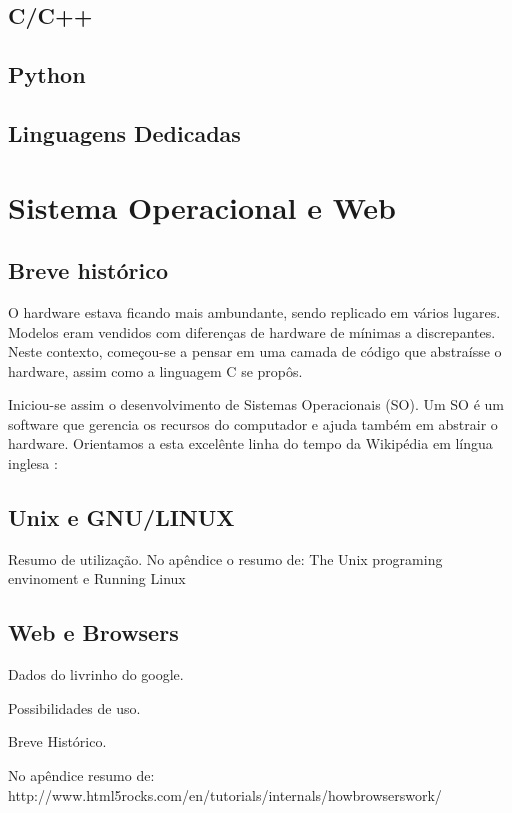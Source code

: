 \subsection{C/C++}

\subsection{Python}

\subsection{Linguagens Dedicadas}

\section{Sistema Operacional e Web}

\subsection{Breve histórico}

O hardware estava ficando mais ambundante, sendo replicado em 
vários lugares. Modelos eram vendidos com diferenças de hardware 
de mínimas a discrepantes. Neste contexto, começou-se a
pensar em uma camada de código que abstraísse o hardware, assim
como a linguagem C se propôs.

Iniciou-se assim o desenvolvimento de Sistemas Operacionais (SO).
Um SO é um software que gerencia os recursos do computador e ajuda
também em abstrair o hardware. Orientamos a esta excelênte linha do
tempo da Wikipédia em língua inglesa \cite{solinhadotempo}:



\subsection{Unix e GNU/LINUX}

Resumo de utilização. No apêndice o resumo de:
The Unix programing envinoment
e
Running Linux

\subsection{Web e Browsers}

Dados do livrinho do google.

Possibilidades de uso.

Breve Histórico.

No apêndice resumo de:
http://www.html5rocks.com/en/tutorials/internals/howbrowserswork/



